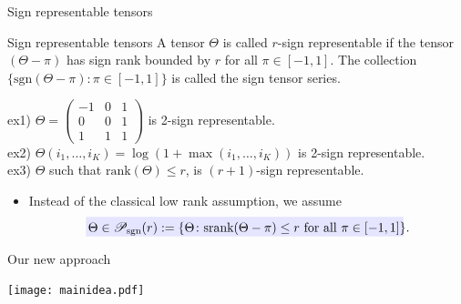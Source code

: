\documentclass[10pt, mathserif]{beamer} %
\theoremstyle{definition}
\theoremstyle{plain}
\def\caliP{\mathscr{P}_{\textup{sgn}}}
\begin{document}
\begin{frame}{Sign representable tensors}
    \begin{block}{Sign representable tensors} A tensor $\Theta$ is called $r$-sign representable if the tensor $(\Theta-\pi)$ has sign rank bounded by $r$ for all $\pi\in[-1,1].$ The collection $\{\text{sgn}(\Theta-\pi)\colon \pi\in[-1,1]\}$ is called the sign tensor series.
    \end{block}
     ex1) $\Theta = \begin{pmatrix}-1&0&1\\0&0&1\\1&1&1\end{pmatrix}$ is 2-sign representable.
       \\[.1cm] ex2) $\Theta(i_1,\ldots,i_K) = \log(1+\max(i_1,\ldots,i_K))$ is 2-sign representable.
       \\[.1cm] ex3) $\Theta$ such that $\text{rank}(\Theta)\leq r$, is $(r+1)$-sign representable.
    \begin{itemize} 
       \item Instead of the classical low rank assumption, we assume
       \begin{align}
         \rlap{\textcolor{blue!10}{\rule[-\dp\strutbox]{250pt}{\baselineskip}}}\,  \Theta\in\caliP(r):=\{\Theta\colon\text{srank}(\Theta-\pi)\leq r \text{ for all } \pi\in[-1,1]\}.
       \end{align}
      \end{itemize}
\end{frame}



\begin{frame}{Our new approach}
    \begin{center}
    \texttt{[image: mainidea.pdf]}
    \end{center}
 
\end{frame}
\end{document}
